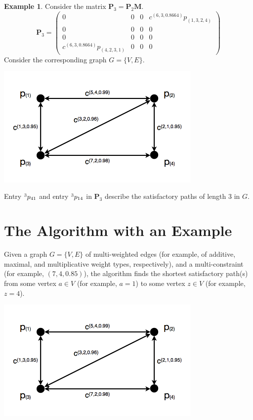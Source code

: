 \documentclass[12pt]{amsart}
\theoremstyle{definition}
\newtheorem{example}[thm]{Example}
\theoremstyle{remark}
\numberwithin{equation}{section}
\begin{document}
\begin{example}
Consider the matrix $\mathbf{P}_3 = \mathbf{P}_2 \mathbf{M}$.
$$
\mathbf{P}_3 = \begin{pmatrix}
0 & 0 & 0 & c^{(6,3,0.8664)} p_{(1,3,2,4)} \\
0 & 0 & 0 & 0 \\
0 & 0 & 0 & 0 \\
c^{(6,3,0.8664)} p_{(4,2,3,1)} & 0 & 0 & 0 \end{pmatrix}
$$
Consider the corresponding graph $G = \{V,E\}$.

\begin{center}\includegraphics[width=10cm]{figure-8-plus.png}\end{center}

\noindent Entry $\prescript{3}{}{p_{41}}$ and entry  $\prescript{3}{}{p_{14}}$ in $\mathbf{P}_3$ describe the satisfactory paths of length $3$ in $G$.
\end{example}

\section{The Algorithm with an Example}

Given a graph $G = \{V,E\}$ of multi-weighted edges (for example, of additive, maximal, and multiplicative weight types, respectively), and a multi-constraint (for example, $(7, 4, 0.85)$), the algorithm finds the shortest satisfactory path(s) from some vertex $a \in V$ (for example, $a = 1$) to some vertex $z \in V$ (for example, $z = 4$).

\begin{center}\includegraphics[width=10cm]{figure-8-plus.png}\end{center}
\end{document}
